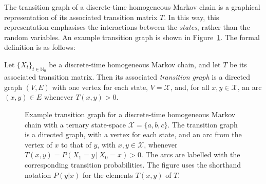\documentclass[graybox]{svmult}
\newcommand{\nats}{\mathbb{N}}
\newcommand{\natswith}{\nats_{0}}
\newcommand{\states}{\mathcal{X}}
\begin{document}
The transition graph of a discrete-time homogeneous Markov chain is a graphical representation of its associated transition matrix $T$. In this way, this representation emphasises the interactions between the \emph{states}, rather than the random variables. An example transition graph is shown in Figure~\ref{fig:example_trans_graph}. The formal definition is as follows:
\begin{definition}\label{def:trans_graph}
Let $\{X_t\}_{t\in\natswith}$ be a discrete-time homogeneous Markov chain, and let $T$ be its associated transition matrix. Then its associated \emph{transition graph} is a directed graph $(V,E)$ with one vertex for each state, $V=\states$, and, for all $x,y\in\states$, an arc $(x,y)\in E$ whenever $T(x,y)>0$.
\end{definition}
\begin{figure}
\centering
{}
\caption{Example transition graph for a discrete-time homogeneous Markov chain with a ternary state-space $\states=\{a,b,c\}$. The transition graph is a directed graph, with a vertex for each state, and an arc from the vertex of $x$ to that of $y$, with $x,y\in\states$, whenever $T(x,y)=P(X_1=y\,\vert\,X_0=x)>0$. The arcs are labelled with the corresponding transition probabilities. The figure uses the shorthand notation $P(y\vert x)$ for the elements $T(x,y)$ of $T$.}
\label{fig:example_trans_graph}
\end{figure}
\end{document}
